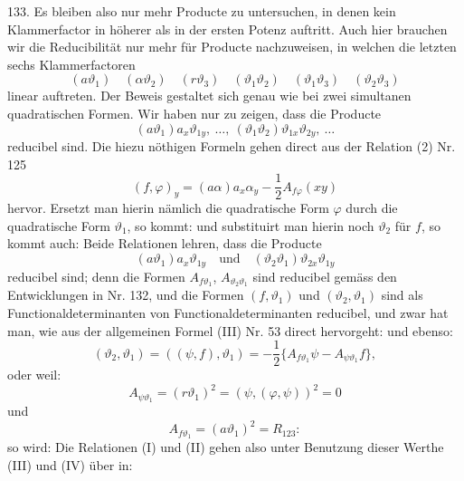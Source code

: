 
133.  Es bleiben also nur mehr Producte zu untersuchen, in denen kein Klammerfactor in h\"oherer als in der ersten Potenz auftritt. Auch hier brauchen wir die Reducibilit\"at nur mehr f\"ur Producte nachzuweisen, in welchen die letzten sechs Klammerfactoren
\[
(a\vartheta_1)\quad(\alpha\vartheta_2)\quad(r\vartheta_3)\quad(\vartheta_1\vartheta_2)\quad(\vartheta_1\vartheta_3)\quad(\vartheta_2\vartheta_3)
\]
linear auftreten. Der Beweis gestaltet sich genau wie bei zwei simultanen quadratischen Formen. Wir haben nur zu zeigen, dass die Producte
\[
(a\vartheta_1)a_x\vartheta_{1y},\ \ldots,\ (\vartheta_1\vartheta_2)\vartheta_{1x}\vartheta_{2y},\ \ldots
\]
reducibel sind. Die hiezu n\"othigen Formeln gehen direct aus der Relation (2) Nr. 125
\[
(f,\varphi)_y=(a\alpha)a_x\alpha_y-\frac{1}{2}A_{f\varphi}(xy)
\]
hervor. Ersetzt man hierin n\"amlich die quadratische Form $\varphi$ durch die quadratische Form $\vartheta_1$, so kommt:
und substituirt man hierin noch $\vartheta_2$ f\"ur $f$, so kommt auch:
Beide Relationen lehren, dass die Producte
\[
(a\vartheta_1)a_x\vartheta_{1y}\quad\text{und}\quad(\vartheta_2\vartheta_1)\vartheta_{2x}\vartheta_{1y}
\]
reducibel sind; denn die Formen $A_{f\vartheta_1}$, $A_{\vartheta_2\vartheta_1}$ sind reducibel gem\"ass den Entwicklungen in Nr. 132, und die Formen $(f,\vartheta_1)$ und $(\vartheta_2,\vartheta_1)$ sind als Functionaldeterminanten von Functionaldeterminanten reducibel, und zwar hat man, wie aus der allgemeinen Formel (III) Nr. 53 direct hervorgeht:
und ebenso:
\[
(\vartheta_2,\vartheta_1)=((\psi,f),\vartheta_1)=-\frac{1}{2}\{A_{f\vartheta_1}\psi-A_{\psi\vartheta_1}f\},
\]
oder weil:
\[
A_{\psi\vartheta_1}=(r\vartheta_1)^2=(\psi,(\varphi,\psi))^2=0
\]
und
\[
A_{f\vartheta_1}=(a\vartheta_1)^2=R_{123}:
\]
so wird:
Die Relationen (I) und (II) gehen also unter Benutzung dieser Werthe (III) und (IV) \"uber in:


